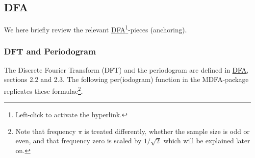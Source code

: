 \documentclass[a4paper]{book}
\begin{document}
\subsection{DFA}\label{dfa_intro}
We here briefly review the relevant \href{http://blog.zhaw.ch/sef/files/2014/10/DFA.pdf}{DFA}\footnote{Left-click to activate the hyperlink.}-pieces (anchoring). 

\subsubsection{DFT and Periodogram}

The Discrete Fourier Transform (DFT) and the periodogram are defined in \href{http://blog.zhaw.ch/sef/files/2014/10/DFA.pdf}{DFA}, sections 2.2 and 2.3. The following per(iodogram) function in the MDFA-package replicates these formulae\footnote{Note that frequency $\pi$ is treated differently, whether the sample size is odd or even, and that frequency zero is scaled by $1/\sqrt{2}$ which will be explained later on.}.  
\end{document}
